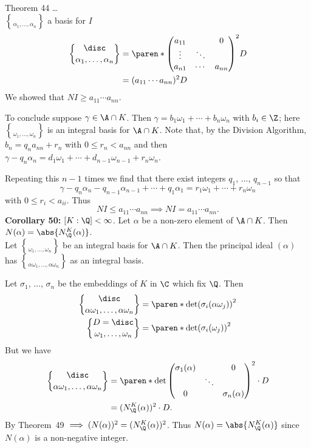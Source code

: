 Theorem 44 \dots \\
$\brace{\alpha_1,\dotsc,\alpha_n}$ a basis for $I$
\begin{align*}
\disc\brace{\alpha_1,\dotsc,\alpha_n} &= \paren*{\begin{pmatrix}
a_{11} & & 0 \\
\vdots & \ddots & \\
a_{n1} & \cdots & a_{nn}
\end{pmatrix}}^2 D \\
&= (a_{11}\dotsm a_{nn})^2 D
\end{align*}
We showed that $NI\geq a_{11}\dotsm a_{nn}$.

To conclude suppose $\gamma\in\A\cap K$.  Then $\gamma=b_1\omega_1+\dotsb+b_n\omega_n$ with $b_i\in\Z$; here $\brace{\omega_1,\dotsc,\omega_n}$ is an integral basis for $\A\cap K$.  Note that, by the Division Algorithm, $b_n=q_n a_{nn} + r_n$ with $0\leq r_n<a_{nn}$ and then $\gamma-q_n\alpha_n=d_1\omega_1+\dotsb+d_{n-1}\omega_{n-1}+r_n\omega_n$.

Repeating this $n-1$ times we find that there exist integers $q_1$, $\dotsc$, $q_{n-1}$ so that
\[ \gamma - q_n\alpha_n - q_{n-1}\alpha_{n-1} + \dotsb + q_1\alpha_1 = r_1\omega_1 + \dotsb + r_n\omega_n \]
with $0\leq r_i<a_{ii}$.  Thus
\[ NI \leq a_{11}\dotsm a_{nn} \implies NI = a_{11}\dotsm a_{nn} . \]
\textbf{Corollary 50:} $[K:\Q]<\infty$.  Let $\alpha$ be a non-zero element of $\A\cap K$.  Then $N(\alpha)=\abs{N_\Q^K(\alpha)}$. \\
\pf Let $\brace{\omega_1,\dotsc,\omega_n}$ be an integral basis for $\A\cap K$.  Then the principal ideal $(\alpha)$ has $\brace{\alpha\omega_1,\dotsc,\alpha\omega_n}$ as an integral basis.

Let $\sigma_1$, $\dotsc$, $\sigma_n$ be the embeddings of $K$ in $\C$ which fix $\Q$.  Then
\begin{align*}
\disc\brace{\alpha\omega_1,\dotsc,\alpha\omega_n} &= \paren*{\det(\sigma_i(\alpha\omega_j))}^2 \\
D = \disc\brace{\omega_1,\dotsc,\omega_n} &= \paren*{\det(\sigma_i(\omega_j))}^2
\end{align*}
But we have
\begin{align*}
\disc\brace{\alpha\omega_1,\dotsc,\alpha\omega_n} &= \paren*{\det\begin{pmatrix}
\sigma_1(\alpha) & & 0 \\
& \ddots & \\
0 & & \sigma_n(\alpha)
\end{pmatrix}}^2\cdot D \\
&= (N_\Q^K(\alpha))^2 \cdot D .
\end{align*}
By Theorem~49 $\implies(N(\alpha))^2=(N_\Q^K(\alpha))^2$.  Thus $N(\alpha)=\abs{N_\Q^K(\alpha)}$ since $N(\alpha)$ is a non-negative integer.

